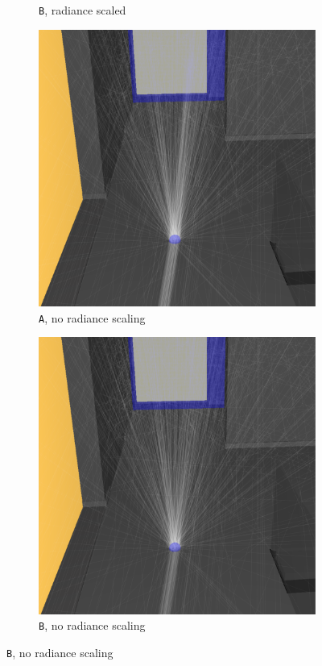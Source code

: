 \begin{figure}
\begin{subfigure}[t]{0.24\linewidth}
		\caption{\texttt{B}, radiance scaled}
		\label{wrong2pathsscaled}
	\end{subfigure}
	\begin{subfigure}[t]{0.24\linewidth}
		\includegraphics[width=\textwidth]{chapters/chapter_results/correct2paths}
		\caption{\texttt{A}, no radiance scaling}
	\end{subfigure}
	\begin{subfigure}[t]{0.24\linewidth}
		\includegraphics[width=\textwidth]{chapters/chapter_results/wrong2paths}
		\caption{\texttt{B}, no radiance scaling}
	\end{subfigure}


\end{figure}
